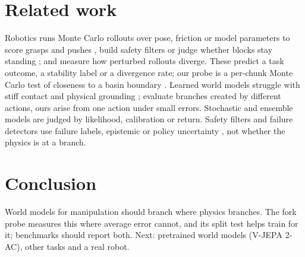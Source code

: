 \documentclass{article}
\begin{document}
\section{Related work}
Robotics runs Monte Carlo rollouts over pose, friction or model parameters to score grasps and pushes
\citep{mahler2017dexnet,agboh2018pushing}, build safety filters \citep{johansson2025safety,wang2026manidreams}
or judge whether blocks stay standing \citep{cannizzaro2024cobra,lerer2016learning};
\citet{goyal2026stability} and \citet{zapolsky2016particle} measure how perturbed rollouts diverge. These
predict a task outcome, a stability label or a divergence rate; our probe is a per-chunk Monte Carlo test
of closeness to a basin boundary \citep{menck2013basin}. Learned world models
\citep{sanchezgonzalez2020learning,allen2023fignet,zhou2025dinowm,assran2025vjepa2,hafner2025dreamerv3}
struggle with stiff contact \citep{parmar2021fundamental} and physical grounding
\citep{bear2021physion,motamed2026physicsiq,yang2026mirabench}; \citet{yu2026evaluated} evaluate branches
created by different actions, ours arise from one action under small errors. Stochastic and ensemble models
\citep{chua2018pets,lakshminarayanan2017ensembles} are judged by likelihood, calibration or return. Safety filters and failure detectors use failure labels, epistemic
or policy uncertainty \citep{nakamura2025generalizing,seo2025uncertainty,xu2025failure,agia2024unpacking},
not whether the physics is at a branch.

\section{Conclusion}\label{sec:conclusion}
World models for manipulation should branch where physics branches. The fork probe measures this where
average error cannot, and its split test helps train for it; benchmarks should report both. Next:
pretrained world models (V-JEPA 2-AC), other tasks and a real robot.
\end{document}

